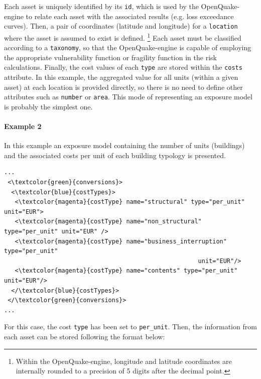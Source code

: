 Each \gls{asset} is uniquely identified by its \Verb+id+, which is used by the OpenQuake-engine to relate each asset with the associated results (e.g. loss exceedance curves). Then, a pair of coordinates (latitude and longitude) for a \Verb+location+ where the asset is assumed to exist is defined. \footnote{Within the OpenQuake-engine, longitude and latitude coordinates are internally rounded to a precision of 5 digits after the decimal point.} Each asset must be classified according to a \Verb+taxonomy+, so that the OpenQuake-engine is capable of employing the appropriate \gls{vulnerability function} or \gls{fragility function} in the risk calculations. Finally, the cost values of each \Verb+type+ are stored within the \Verb+costs+ attribute. In this example, the aggregated value for all units (within a given asset) at each location is provided directly, so there is no need to define other attributes such as \Verb+number+ or \Verb+area+. This mode of representing an exposure model is probably the simplest one.

\paragraph{Example 2}
In this example an \gls{exposure model} containing the number of units (buildings) and the associated costs per unit of each building typology is presented.

\begin{Verbatim}[frame=single, commandchars=\\\{\}, samepage=false]
...
 <\textcolor{green}{conversions}>
  <\textcolor{blue}{costTypes}>
   <\textcolor{magenta}{costType} name="structural" type="per_unit" unit="EUR">
   <\textcolor{magenta}{costType} name="non_structural" type="per_unit" unit="EUR" />
   <\textcolor{magenta}{costType} name="business_interruption" type="per_unit" 
                                                      unit="EUR"/>
   <\textcolor{magenta}{costType} name="contents" type="per_unit" unit="EUR"/>
  </\textcolor{blue}{costTypes}>
 </\textcolor{green}{conversions}>
...
\end{Verbatim}

For this case, the cost \Verb+type+ has been set to \Verb+per_unit+. Then, the information from each asset can be stored following the format below:

